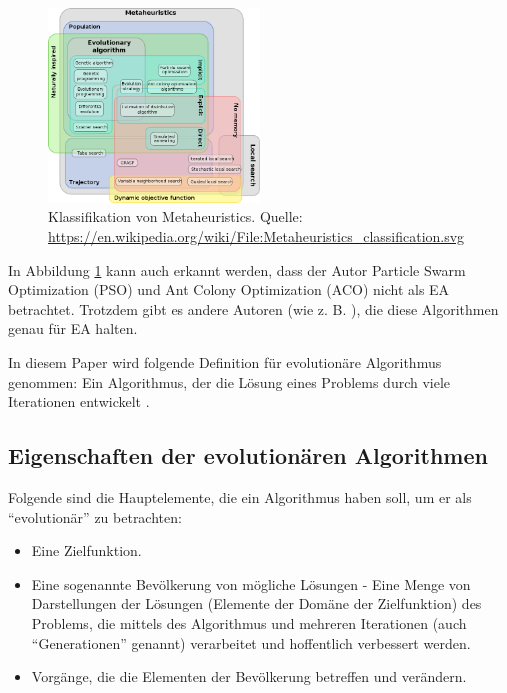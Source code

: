 \documentclass[twoside,twocolumn]{article}
\begin{document}
\begin{figure}
\caption{Klassifikation von Metaheuristics. Quelle: \url{https://en.wikipedia.org/wiki/File:Metaheuristics_classification.svg}}
\label{fig:metaheuristics}
\centering
\includegraphics[width=0.5\textwidth]{images/metaheuristics_classification.png}
\end{figure}

In Abbildung \ref{fig:metaheuristics} kann auch erkannt werden, dass der Autor Particle Swarm Optimization (PSO) und Ant Colony Optimization (ACO) nicht als EA betrachtet. Trotzdem gibt es andere Autoren (wie z. B. \cite{wiley_evolutionary}), die diese Algorithmen genau für EA halten.\par

In diesem Paper wird folgende Definition für evolutionäre Algorithmus genommen: Ein Algorithmus, der die Lösung eines Problems durch viele Iterationen entwickelt    .

\subsection{Eigenschaften der evolutionären Algorithmen}
Folgende sind die Hauptelemente, die ein Algorithmus haben soll, um er als \enquote{evolutionär} zu betrachten:

\begin{itemize}
\item{Eine Zielfunktion.}
\item{Eine sogenannte Bevölkerung von mögliche Lösungen - Eine Menge von Darstellungen der Lösungen (Elemente der Domäne der Zielfunktion) des Problems, die mittels des Algorithmus und mehreren Iterationen (auch \enquote{Generationen} genannt) verarbeitet und hoffentlich verbessert werden.}
\item{Vorgänge, die die Elementen der Bevölkerung betreffen und verändern.}
\end{itemize}
\end{document}
